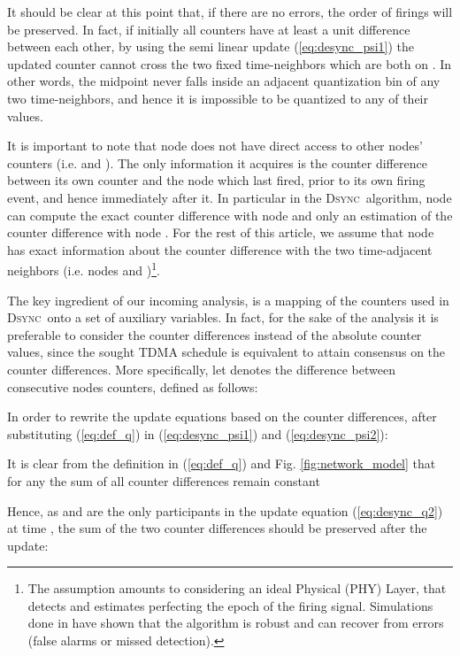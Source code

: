 \documentclass[conference]{IEEEtran}
\newcommand{\DDD}{\textsc{Dsync~}}
\theoremstyle{definition}
\theoremstyle{definition}
\begin{document}
It should be clear at this point that, if there are no errors, the order of firings will be preserved. In fact, if initially all counters have at least a unit difference between each other, by using the semi linear update (\ref{eq:desync_psi1}) the updated counter cannot cross the two fixed time-neighbors which are both on . In other words, the midpoint never falls inside an adjacent quantization bin of any two time-neighbors, and hence it is impossible to be quantized to any of their values.

It is important to note that node  does not have direct access to other nodes' counters (i.e.  and ). The only information it acquires is the counter difference between its own counter and the node which last fired, prior to its own firing event, and hence immediately after it. In particular in the \DDD algorithm, node  can compute the exact counter difference with node  and only an estimation of the counter difference with node . For the rest of this article, we assume that node  has exact information about the counter difference with the two time-adjacent neighbors (i.e. nodes  and )\footnote{ The assumption amounts to considering an ideal Physical (PHY) Layer, that detects and estimates perfecting the epoch of the firing signal. Simulations done in \cite{pfs} have shown that the algorithm is robust and can recover from errors (false alarms or missed detection).}. 

The key ingredient of our incoming analysis, is a mapping of the counters used in \DDD onto a set of auxiliary variables. In fact, for the sake of the analysis it is preferable to consider the counter differences instead of the absolute counter values, since the sought TDMA schedule is equivalent to attain consensus on the counter differences. More specifically, let  denotes the difference between consecutive nodes counters, defined as follows:
 
In order to rewrite the update equations based on the counter differences, after substituting (\ref{eq:def_q}) in (\ref{eq:desync_psi1}) and (\ref{eq:desync_psi2}):

It is clear from the definition in (\ref{eq:def_q}) and Fig. \ref{fig:network_model} that for any  the sum of all counter differences remain constant 

Hence, as  and  are the only participants in the update equation (\ref{eq:desync_q2}) at time , the sum of the two counter differences should be preserved after the update:
\end{document}
